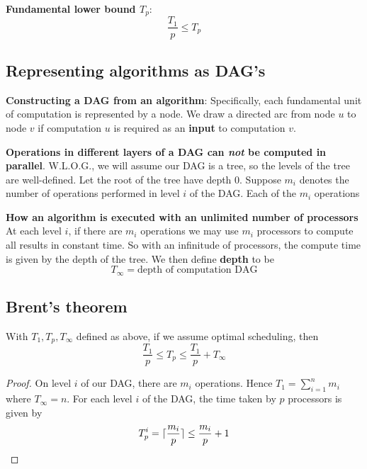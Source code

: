 \documentclass[11pt]{article}
\begin{document}
\textbf{Fundamental lower bound \(T_p\)}:
\begin{equation*}
\frac{T_1}{p}\le T_p
\end{equation*}
\subsection{Representing algorithms as DAG's}
\label{sec:org3ebaf40}
\textbf{Constructing a DAG from an algorithm}: Specifically, each fundamental unit of computation is
represented by a node. We draw a directed arc from node \(u\) to node \(v\) if
computation \(u\) is required as an \textbf{input} to computation \(v\).

\textbf{Operations in different layers of a DAG can \emph{not} be computed in parallel}. W.L.O.G., we will
assume our DAG is a tree, so the levels of the tree are well-defined. Let the root of the tree
have depth 0. Suppose \(m_i\) denotes the number of operations performed in level \(i\) of the
DAG. Each of the \(m_i\) operations

\textbf{How an algorithm is executed with an unlimited number of processors} At each level \(i\), if
there are \(m_i\) operations we may use \(m_i\) processors to compute all results in constant
time. So with an infinitude of processors, the compute time is given by the depth of the tree.
We then define \textbf{depth} to be
 \begin{equation*}
T_\infty=\text{depth of computation DAG}
 \end{equation*}
\subsection{Brent's theorem}
\label{sec:org9746c1b}
\begin{theorem}[]
With \(T_1,T_p,T_\infty\) defined as above, if we assume optimal scheduling, then
\begin{equation*}
\frac{T_1}{p}\le T_p\le \frac{T_1}{p}+T_\infty
\end{equation*}
\end{theorem}

\begin{proof}
On level \(i\) of our DAG, there are \(m_i\) operations. Hence \(T_1=\sum_{i=1}^nm_i\) where \(T_\infty=n\).
For each level \(i\) of the DAG, the time taken by \(p\) processors is given by
\begin{equation*}
T_p^i=\lceil \frac{m_i}{p} \rceil\le\frac{m_i}{p}+1
\end{equation*}
\end{proof}
\end{document}
